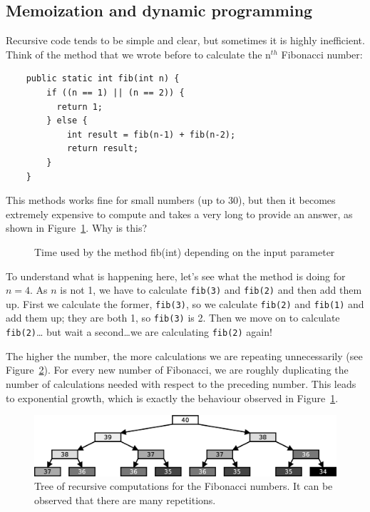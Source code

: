 \vspace{1cm}

\subsection{Memoization and dynamic programming}
\label{sec:memo-dynam-progr}

Recursive code tends to be simple and clear, but sometimes it is
highly inefficient. Think of the method that we wrote before to
calculate the n$^{th}$ Fibonacci number: 

\begin{verbatim}
    public static int fib(int n) {
        if ((n == 1) || (n == 2)) {
          return 1; 
        } else {
            int result = fib(n-1) + fib(n-2);
            return result;
        }
    }
\end{verbatim}

This methods works fine for small numbers (up to 30), but then it
becomes extremely expensive to compute and takes a very long to
provide an answer, as shown in Figure~\ref{fig:fibotime}. Why is this? 

\begin{figure}[hbtp]
  \centering
  
  \caption{Time used by the method fib(int) depending on the input parameter}
  \label{fig:fibotime}
\end{figure}

To understand what is happening here, let's see what the method is
doing for $n = 4$. As $n$ is not 1, 
we have to calculate \verb+fib(3)+ and \verb+fib(2)+
and then add them up. First we calculate the former, \verb+fib(3)+, so
we calculate \verb+fib(2)+ and \verb+fib(1)+ and add them up; they are both 1, so
\verb+fib(3)+ is 2. Then we move on to calculate \verb+fib(2)+\ldots
but wait a second\ldots we are calculating \verb+fib(2)+ again! 

The higher the number, the more calculations we are repeating
unnecessarily (see Figure~\ref{fig:fibotree}). For every new number of
Fibonacci, we are roughly duplicating the number of calculations
needed with respect to the preceding number. This leads to exponential
growth, which is exactly the behaviour observed in
Figure~\ref{fig:fibotime}. 

\begin{figure}[hbtp]
  \centering
  \includegraphics[width=\textwidth]{gfx/factorial-tree}
  \caption{Tree of recursive computations for the Fibonacci numbers. It can be observed that there are many repetitions. }
  \label{fig:fibotree}
\end{figure}

